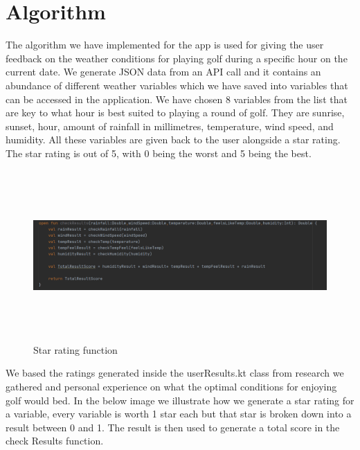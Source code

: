 \section{Algorithm}
The algorithm we have implemented for the app is used for giving the user feedback on the weather conditions for playing golf during a specific hour on the current date. We generate JSON data from an API call and it contains an abundance of different weather variables which we have saved into variables that can be accessed in the application. We have chosen 8 variables from the list that are key to what hour is best suited to playing a round of golf. They are sunrise, sunset, hour, amount of rainfall in millimetres, temperature, wind speed, and humidity. All these variables are given back to the user alongside a star rating. The star rating is out of 5, with 0 being the worst and 5 being the best. 
\begin{figure}[H]
    \centering
    \includegraphics[width=13cm,height =6.5cm]{img/starRating.PNG}
    \caption{Star rating function}
    \label{fig:Star rating function}
\end{figure}

We based the ratings generated inside the userResults.kt class from \newline research we gathered and personal experience on what the optimal conditions for enjoying golf would bed. \cite{ref11} In the below image we illustrate how we generate a star rating for a variable, every variable is worth 1 star each but that star is broken down into a result between 0 and 1. The result is then used to generate a total score in the check Results function.

